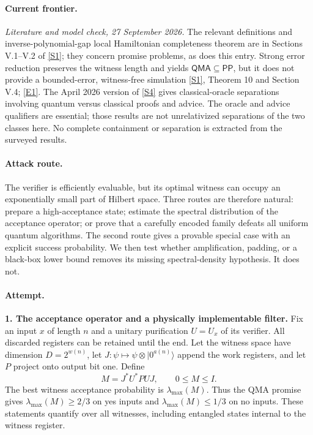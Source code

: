 \documentclass[11pt,a4paper]{article}
\newcommand{\sref}[2]{\hyperlink{source:#1:#2}{[S#2]}}
\newcommand{\eref}[2]{\hyperlink{extra:#1:#2}{[E#2]}}
\numberwithin{equation}{section}
\begin{document}
\paragraph{Current frontier.}
\textit{Literature and model check, 27 September 2026.}
The relevant definitions and inverse-polynomial-gap local Hamiltonian
completeness theorem are in Sections V.1--V.2 of \sref{statement}{1}; they concern
promise problems, as does this entry. Strong error reduction preserves the
witness length and yields $\mathsf{QMA}\subseteq\mathsf{PP}$, but it does
not provide a bounded-error, witness-free simulation
\sref{statement}{1}, Theorem 10 and Section V.4; \eref{statement}{1}.
The April 2026 version of \sref{statement}{4} gives classical-oracle separations
involving quantum versus classical proofs and advice. The oracle and advice
qualifiers are essential; those results are not unrelativized separations
of the two classes here. No complete containment or separation is extracted
from the surveyed results.

\paragraph{Attack route.}
The verifier is efficiently evaluable, but its optimal witness can occupy
an exponentially small part of Hilbert space. Three routes are therefore
natural: prepare a high-acceptance state; estimate the spectral distribution
of the acceptance operator; or prove that a carefully encoded family defeats
all uniform quantum algorithms. The second route gives a provable special
case with an explicit success probability. We then test whether amplification,
padding, or a black-box lower bound removes its missing spectral-density
hypothesis. It does not.

\paragraph{Attempt.}
\textbf{1. The acceptance operator and a physically implementable filter.}
Fix an input $x$ of length $n$ and a unitary purification $U=U_x$ of its
verifier. All discarded registers can be retained until the end. Let the
witness space have dimension $D=2^{w(n)}$, let
$J:\psi\mapsto\psi\otimes|0^{a(n)}\rangle$ append the work registers,
and let $P$ project onto output bit one. Define
\[
 M=J^*U^*PUJ,\qquad 0\le M\le I.
\]
The best witness acceptance probability is $\lambda_{\max}(M)$. Thus the
QMA promise gives $\lambda_{\max}(M)\ge2/3$ on yes inputs and
$\lambda_{\max}(M)\le1/3$ on no inputs. These statements quantify over
all witnesses, including entangled states internal to the witness register.
\end{document}
